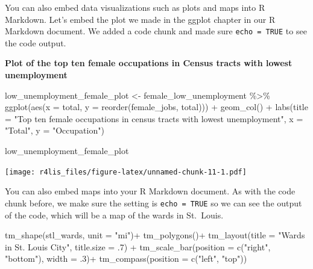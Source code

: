 \documentclass[
  krantz2]{krantz}
\makeatletter
\newenvironment{Shaded}{\begin{snugshade}}{\end{snugshade}}
\newcommand{\AttributeTok}[1]{\textcolor[rgb]{0.61,0.61,0.61}{#1}}
\newcommand{\DecValTok}[1]{\textcolor[rgb]{0.06,0.06,0.06}{#1}}
\newcommand{\FunctionTok}[1]{\textcolor[rgb]{0,0,0}{#1}}
\newcommand{\NormalTok}[1]{#1}
\newcommand{\OtherTok}[1]{\textcolor[rgb]{0.37,0.37,0.37}{#1}}
\newcommand{\SpecialCharTok}[1]{\textcolor[rgb]{0,0,0}{#1}}
\newcommand{\StringTok}[1]{\textcolor[rgb]{0.5,0.5,0.5}{#1}}
\newenvironment{kframe}{%
\medskip{}
\setlength{\fboxsep}{.8em}
 \def\at@end@of@kframe{}%
 \ifinner\ifhmode%
  \def\at@end@of@kframe{\end{minipage}}%
  \begin{minipage}{\columnwidth}%
 \fi\fi%
 \def\FrameCommand##1{\hskip\@totalleftmargin \hskip-\fboxsep
 \colorbox{shadecolor}{##1}\hskip-\fboxsep
     \hskip-\linewidth \hskip-\@totalleftmargin \hskip\columnwidth}%
 \MakeFramed {\advance\hsize-\width
   \@totalleftmargin\z@ \linewidth\hsize
   \@setminipage}}%
 {\par\unskip\endMakeFramed%
 \at@end@of@kframe}
\renewenvironment{Shaded}{\begin{kframe}}{\end{kframe}}
\makeatother
\begin{document}
You can also embed data visualizations such as plots and maps into R Markdown. Let's embed the plot we made in the ggplot chapter in our R Markdown document. We added a code chunk and made sure \texttt{echo\ =\ TRUE} to see the code output.

\textbf{Plot of the top ten female occupations in Census tracts with lowest unemployment}

\begin{Shaded}
\begin{Highlighting}[]
\NormalTok{low\_unemployment\_female\_plot }\OtherTok{\textless{}{-}}\NormalTok{ female\_low\_unemployment }\SpecialCharTok{\%\textgreater{}\%}
  \FunctionTok{ggplot}\NormalTok{(}\FunctionTok{aes}\NormalTok{(}\AttributeTok{x =}\NormalTok{ total, }\AttributeTok{y =} \FunctionTok{reorder}\NormalTok{(female\_jobs, total))) }\SpecialCharTok{+}
  \FunctionTok{geom\_col}\NormalTok{() }\SpecialCharTok{+}
  \FunctionTok{labs}\NormalTok{(}\AttributeTok{title =} \StringTok{"Top ten female occupations in census tracts with lowest unemployment"}\NormalTok{,}
       \AttributeTok{x =} \StringTok{"Total"}\NormalTok{, }\AttributeTok{y =} \StringTok{"Occupation"}\NormalTok{)}

\NormalTok{low\_unemployment\_female\_plot}
\end{Highlighting}
\end{Shaded}

\texttt{[image: r4lis\_files/figure-latex/unnamed-chunk-11-1.pdf]}

You can also embed maps into your R Markdown document. As with the code chunk before, we make sure the setting is \texttt{echo\ =\ TRUE} so we can see the output of the code, which will be a map of the wards in St.~Louis.

\begin{Shaded}
\begin{Highlighting}[]
\FunctionTok{tm\_shape}\NormalTok{(stl\_wards, }\AttributeTok{unit =} \StringTok{"mi"}\NormalTok{)}\SpecialCharTok{+}
  \FunctionTok{tm\_polygons}\NormalTok{()}\SpecialCharTok{+}
  \FunctionTok{tm\_layout}\NormalTok{(}\AttributeTok{title =} \StringTok{"Wards in St. Louis City"}\NormalTok{, }\AttributeTok{title.size =}\NormalTok{ .}\DecValTok{7}\NormalTok{) }\SpecialCharTok{+}
  \FunctionTok{tm\_scale\_bar}\NormalTok{(}\AttributeTok{position =} \FunctionTok{c}\NormalTok{(}\StringTok{"right"}\NormalTok{, }\StringTok{"bottom"}\NormalTok{), }\AttributeTok{width =}\NormalTok{ .}\DecValTok{3}\NormalTok{)}\SpecialCharTok{+}
  \FunctionTok{tm\_compass}\NormalTok{(}\AttributeTok{position =} \FunctionTok{c}\NormalTok{(}\StringTok{"left"}\NormalTok{, }\StringTok{"top"}\NormalTok{))}
\end{Highlighting}
\end{Shaded}
\end{document}
